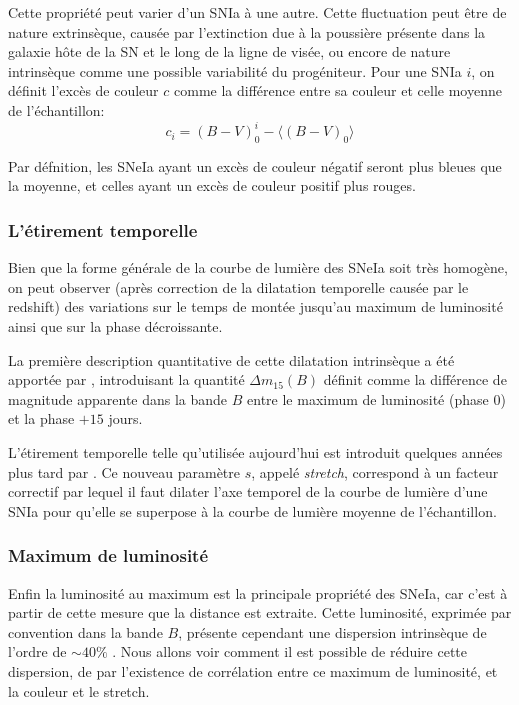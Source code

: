 \documentclass[../main/main.tex]{subfiles}
\begin{document}
Cette propriété peut varier d'un SNIa à une autre. Cette fluctuation
peut être de nature extrinsèque, causée par l'extinction due à la
poussière présente dans la galaxie hôte de la SN et le long de la ligne
de visée, ou encore de nature intrinsèque comme une possible variabilité
du progéniteur.
Pour une SNIa $i$, on définit l'excès de couleur $c$ comme la différence
entre sa couleur et celle moyenne de l'échantillon:
\begin{equation}
  \label{eq:color}
  c_{i}=(B-V)^{i}_{0}-\langle(B-V)_{0}\rangle
\end{equation}

Par défnition, les SNeIa ayant un excès de couleur négatif seront plus
bleues que la moyenne, et celles ayant un excès de couleur positif plus
rouges.

\subsubsection*{L'étirement temporelle}

Bien que la forme générale de la courbe de lumière des SNeIa soit très
homogène, on peut observer (après correction de la dilatation temporelle
causée par le redshift) des variations sur le temps de montée
jusqu'au maximum de luminosité ainsi que sur la phase décroissante.

La première description quantitative de cette dilatation intrinsèque a
été apportée par \citet{Phillips1993},
introduisant la quantité $\Delta m_{15}(B)$ définit comme la différence de
magnitude apparente dans la bande $B$ entre le maximum de luminosité
(phase $0$) et la phase $+15$ jours.

L'étirement temporelle telle qu'utilisée aujourd'hui est introduit
quelques années plus tard par \citet{Perlmutter1997}. Ce nouveau
paramètre $s$, appelé \textit{stretch}, correspond à un facteur
correctif par lequel il faut dilater l'axe temporel de la courbe de
lumière d'une SNIa pour qu'elle se superpose à la courbe de lumière
moyenne de l'échantillon.
\subsubsection*{Maximum de luminosité}

Enfin la luminosité au maximum est la principale propriété des SNeIa, car
c'est à partir de cette mesure que la distance est extraite. 
Cette luminosité, exprimée par convention dans la bande $B$, présente cependant une dispersion intrinsèque de
l'ordre de $\sim40\%$ \citep{Hamuy1996}. Nous allons voir comment il est
possible de réduire cette dispersion, de par l'existence de corrélation
entre ce maximum de luminosité, et la couleur et le stretch. 
\clearpage
\end{document}
